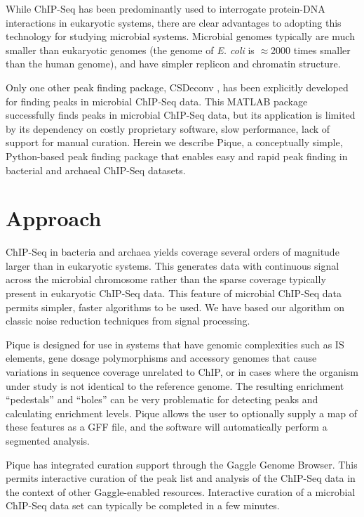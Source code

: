 \documentclass{bioinfo}
\begin{document}
While ChIP-Seq has been predominantly used to interrogate protein-DNA
interactions in eukaryotic systems, there are clear advantages to
adopting this technology for studying microbial systems. Microbial
genomes typically are much smaller than eukaryotic genomes (the genome
of {\em E. coli} is $\approx$2000 times smaller than the human
genome), and have simpler replicon and chromatin structure.  

Only one other peak finding package, CSDeconv \cite{CSDeconv}, has
been explicitly developed for finding peaks in microbial ChIP-Seq
data. This MATLAB package successfully finds peaks in microbial
ChIP-Seq data, but its application is limited by its dependency on
costly proprietary software, slow performance, lack of support for
manual curation. Herein we describe Pique, a conceptually simple,
Python-based peak finding package that enables easy and rapid peak
finding in bacterial and archaeal ChIP-Seq datasets.

\section{Approach}

\noindent ChIP-Seq in bacteria and archaea yields coverage several
orders of magnitude larger than in eukaryotic systems.  This generates
data with continuous signal across the microbial chromosome rather
than the sparse coverage typically present in eukaryotic ChIP-Seq
data.  This feature of microbial ChIP-Seq data permits simpler, faster
algorithms to be used. We have based our algorithm on classic noise
reduction techniques from signal processing.

Pique is designed for use in systems that have genomic complexities
such as IS elements, gene dosage polymorphisms and accessory genomes
that cause variations in sequence coverage unrelated to ChIP, or in
cases where the organism under study is not identical to the reference
genome. The resulting enrichment ``pedestals'' and ``holes'' can be
very problematic for detecting peaks and calculating enrichment
levels. Pique allows the user to optionally supply a map of these
features as a GFF file, and the software will automatically perform a
segmented analysis.

Pique has integrated curation support through the Gaggle Genome
Browser. This permits interactive curation of the peak list and
analysis of the ChIP-Seq data in the context of other Gaggle-enabled
resources. Interactive curation of a microbial ChIP-Seq data set can
typically be completed in a few minutes.
\end{document}
